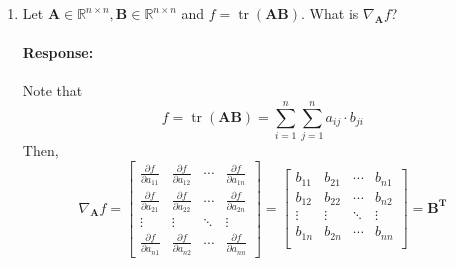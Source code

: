 \documentclass [11pt] {article}
\newcommand{\R}{\mathbb{R}}
\newcommand{\T}{\bf{T}}
\newcommand{\A}{\bf{A}}
\newcommand{\B}{\bf{B}}
\newenvironment{response}{\begin{responseframe}\vspace{-10pt}\paragraph{Response:}}{\end{responseframe}}
\DeclareMathOperator{\tr}{tr}
\renewcommand{\bf}[1]{\textbf{{#1}}}
\begin{document}
\begin{enumerate}
\begin{enumerate}[itemsep=10pt]
            \item Let $\A \in \R^{n \times n}, \B \in \R^{n \times n}$ and 
                $f = \tr\left( \A \B \right)$. What is $\nabla_{\A} f$?
                \begin{response}
                    Note that
                    \[f = \tr\left( \A \B \right) = \sum^{n}_{i = 1} \sum^{n}_{j = 1} a_{ij} \cdot b_{ji}\]
                    Then, 
                    \[
                        \nabla_{\A} f =
                        \begin{bmatrix}
                            \frac{\partial f}{\partial a_{11}} & \frac{\partial f}{\partial a_{12}} & \cdots & \frac{\partial f}{\partial a_{1n}} \\
                            \frac{\partial f}{\partial a_{21}} & \frac{\partial f}{\partial a_{22}} & \cdots & \frac{\partial f}{\partial a_{2n}} \\
                            \vdots & \vdots & \ddots & \vdots \\
                            \frac{\partial f}{\partial a_{n1}} & \frac{\partial f}{\partial a_{n2}} & \cdots & \frac{\partial f}{\partial a_{nn}}
                        \end{bmatrix} = 
                        \begin{bmatrix}
                            b_{11} & b_{21} & \cdots & b_{n1} \\
                            b_{12} & b_{22} & \cdots & b_{n2} \\
                            \vdots & \vdots & \ddots & \vdots \\
                            b_{1n} & b_{2n} & \cdots & b_{nn} \\
                        \end{bmatrix} = \B^{\T}
                    \]
                \end{response}


\end{enumerate}
\end{enumerate}
\end{document}
